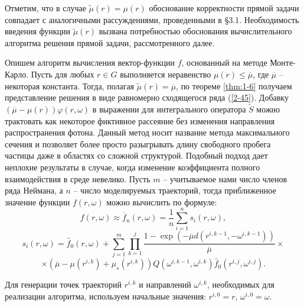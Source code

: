 Отметим, что в случае $\widetilde{\mu}(r) = \mu(r)$ обоснование
корректности прямой задачи совпадает с аналогичными рассуждениями,
проведенными в \S 3.1. Необходимость введения функции
$\widetilde{\mu}(r)$ вызвана потребностью обоснования
вычислительного алгоритма решения прямой задачи, рассмотренного
далее.


Опишем алгоритм вычисления вектор-функции $f$, основанный на
методе Монте-Карло. Пусть для любых $r\in G $ выполняется
неравенство $\mu(r)\leq \overline{\mu}$, где $\overline{\mu}$ --
некоторая константа. Тогда, полагая $\widetilde{\mu}(r) =
\overline{\mu}$, по теореме \ref{thm:1-6} получаем представление
решения в виде равномерно сходящегося ряда  (\ref{2-45}). Добавку
$(\overline{\mu}-\mu(r))\varphi(r,\omega)$ в выражении для
интегрального оператора $\widetilde{S}$ можно трактовать как
некоторое фиктивное рассеяние без изменения направления
распространения фотона. Данный метод носит название метода
максимального сечения и позволяет более просто разыгрывать длину
свободного пробега частицы даже в областях со сложной структурой.
Подобный подход дает неплохие результаты в случае, когда изменение
коэффициента полного взаимодействия в среде невелико. Пусть $m$ --
учитываемое нами число членов ряда Неймана, а $n$ -- число
моделируемых траекторий, тогда приближенное значение функции
$f(r,\omega)$ можно вычислить по формуле:
\begin{equation}
    \label{2-53}
    f(r,\omega)\approx \overline{f}_n(r,\omega) = \frac{1}{n} \sum
    \limits_{i=1}^{n} s_i(r,\omega),
\end{equation}
\[
    s_i(r,\omega) = \widetilde{f_0}(r,\omega)+ \sum \limits_{j=1}^{m}
    \prod \limits_{k=1}^{j} \frac{1-\exp(-\overline{\mu}
    d(r^{i,k-1},-\omega^{i,k-1}))} {\overline{\mu}}\times
\]
\[
    \times(\overline{\mu}-\mu(r^{i,k})+\mu_s(r^{i,k}))
    Q(\omega^{i,k-1},\omega^{i,k})
    \widetilde{f_0}(r^{i,j},\omega^{i,j}).
\]


Для генерации точек траекторий $r^{i,k}$ и направлений
$\omega^{i,k}$, необходимых для реализации алгоритма, используем
начальные значения: $r^{i,0} = r$, $\omega^{i,0} = \omega$.

